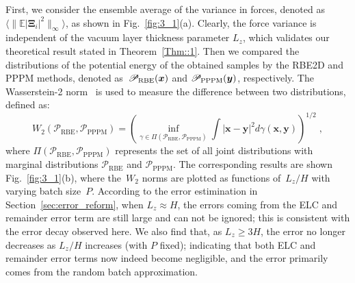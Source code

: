 First, we consider the ensemble average of the variance in forces, denoted as $\langle\|\mathbb{E}|\bm{\Xi}_i|^2\|_{\infty}\rangle$, as shown in Fig.~\ref{fig:3_1}(a). 
Clearly, the force variance is independent   {of} the vacuum layer thickness parameter $L_z$, which validates our theoretical result stated in Theorem~\ref{Thm::1}. 
 {Then we compared the distributions of the potential energy of the obtained samples by the RBE2D and PPPM methods, denoted as~$\mathscr{P}_{\text{RBE}}(\boldsymbol{x})$ and $\mathscr{P}_{\text{PPPM}}(\boldsymbol{y})$, respectively.
The Wasserstein-2 norm~\cite{santambrogio2015optimal, kolbe_2024_10912241} is used to measure the difference between two distributions, defined as:}
\begin{equation}\label{eq::W2}
    W_2(\mathscr{P}_{\text{RBE}}, \mathscr{P}_{\text{PPPM}})=\left(\inf _{\gamma \in \Pi(\mathscr{P}_{\text{RBE}}, \mathscr{P}_{\text{PPPM}})} \int|\bm{x} - \bm{y}|^2 d  {\gamma(\bm{x},\bm{y})}\right)^{1 / 2}\;,
\end{equation}
where $\Pi(\mathscr{P}_{\text{RBE}}, \mathscr{P}_{\text{PPPM}})$ represents the set of all joint distributions with marginal distributions $\mathscr{P}_{\text{RBE}}$ and $\mathscr{P}_{\text{PPPM}}$.
The corresponding results are shown Fig.~\ref{fig:3_1}(b), where the~$W_2$ norms are   {plotted} as functions of~$L_z / H$ with   {varying} batch size~$P$.
According to the error estimination in Section~\ref{sec:error_reform}, when $L_z\approx H$, the errors coming from the ELC and remainder error term are still large and can not be ignored;   {this} is consistent with the error decay observed here. 
We also find that, as $L_z\geq 3H$, the error no longer decreases as $L_z/H$ increases (with $P$ fixed); indicating that
both ELC and remainder error terms now indeed become negligible, and the error primarily comes from the random batch approximation. 


